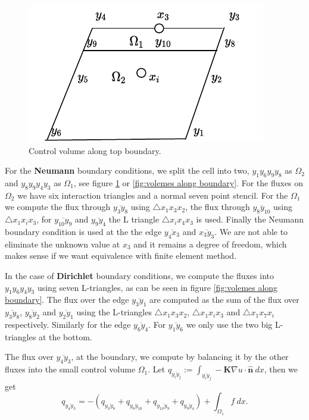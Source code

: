 \documentclass[../Main/main.tex]{subfiles}
\begin{document}
	\begin{figure}[H]
		\centering
		\includegraphics{volumepartition.pdf}
		\caption{Control volume along top boundary.}
		\label{fig:volumepartition}
	\end{figure}
	For the \textbf{Neumann} boundary conditions, we split the cell into two, $y_1 y_6 y_9 y_8$ as $\Omega_2$ and $y_8 y_9 y_4 y_3$ as  $\Omega_1$, see figure \ref{fig:volumepartition} or \ref{fig:volemes along boundary}. For the fluxes on $\Omega_2$ we have six interaction triangles and a normal seven point stencil. For the $\Omega_1$ we compute the flux through $\overline{y_3 y_8}$ using $\triangle x_1 x_3 x_2$, the flux through $\overline{y_8 y_{10}}$ using $\triangle x_1 x_i x_3$, for $\overline{y_{10}y_9}$ and $\overline{y_9 y_4}$ the L triangle  $\triangle x_i x_4 x_3$ is used. Finally the Neumann boundary condition is used at the the edge $\overline{y_4 x_3}$ and $\overline{x_3 y_3}$. We are not able to eliminate the unknown value at $x_3$ and it remains a degree of freedom, which makes sense if we want equivalence with finite element method.
	\par
	In the case of \textbf{Dirichlet} boundary conditions, we compute the fluxes into $y_1 y_6 y_4 y_3$ using seven L-triangles, as can be seen in figure \ref{fig:volemes along boundary}. The flux over the edge $\overline{y_3 y_1}$ are computed as the sum of the flux over $\overline{y_3 y_8}$, $\overline{y_8 y_2}$ and $\overline{y_2 y_1}$ using the L-triangles $\triangle x_1 x_3 x_2$, $\triangle x_1 x_i x_3$ and $\triangle x_1 x_7 x_i$ respectively. Similarly for the edge $\overline{y_6 y_4}$. For $\overline{y_1 y_6}$ we only use the two big L-triangles at the bottom. 
	\par 
	The flux over $\overline{y_4 y_3}$, at the boundary, we compute by balancing it by the other fluxes into the small control volume $\Omega_1$. Let $	q_{\overline{y_i y_j}}:= \int_{\overline{y_i y_j}}  -\pmb{K}\nabla u \cdot \pmb{\hat{n}}\ dx $, then we get
	\begin{equation}\label{eq:K2}
		q_{\overline{y_4 y_3}} =-( q_{\overline{y_3 y_8}} + q_{\overline{y_8 y_{10}}}+q_{\overline{y_{10}y_9}}+q_{\overline{y_9 y_4}}) + \int_{\Omega_1} f \ dx.
	\end{equation}
	
\end{document}

